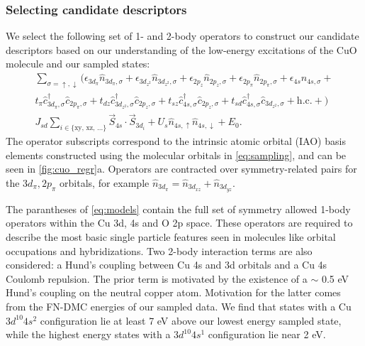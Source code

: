 \documentclass[12pt]{article}
\begin{document}
\subsubsection{Selecting candidate descriptors}
We select the following set of 1- and 2-body operators to construct our candidate descriptors based on our understanding of the low-energy excitations of the CuO molecule and our sampled states:
\begin{equation}
\begin{split}
\sum_{\sigma = \uparrow, \downarrow} \Bigg(\epsilon_{3d_\pi}\hat{n}_{3d_\pi,\sigma} + \epsilon_{3d_{z^2}}\hat{n}_{3d_{z^2},\sigma} +  \epsilon_{2p_z} \hat{n}_{2p_z,\sigma} + \epsilon_{2p_\pi}\hat{n}_{2p_\pi,\sigma} + \epsilon_{4s}\hat{n}_{4s,\sigma} +\\
t_\pi \hat{c}_{3d_\pi,\sigma}^\dagger \hat{c}_{2p_\pi,\sigma} + t_{dz} \hat{c}_{3d_{z^2},\sigma}^\dagger \hat{c}_{2p_z,\sigma}  + t_{sz}\hat{c}_{4s,\sigma}^\dagger \hat{c}_{2p_z,\sigma} + t_{sd}\hat{c}_{4s,\sigma}^\dagger \hat{c}_{3d_{z^2},\sigma} + \text{h.c.} + \Bigg)  \\
J_{sd}\sum_{i\in {\{\text{xy, xz, ...}}\}} \vec{S}_{4s} \cdot \vec{S}_{3d_i} + U_s \hat{n}_{4s,\uparrow}\hat{n}_{4s,\downarrow} + E_0.
\end{split}
\label{eq:models}
\end{equation}
The operator subscripts correspond to the intrinsic atomic orbital (IAO) basis elements constructed using the molecular orbitals in \eqref{eq:sampling}, and can be seen in \ref{fig:cuo_regr}a.
Operators are contracted over symmetry-related pairs for the $3d_\pi, 2p_\pi$ orbitals, for example $\hat{n}_{3d_\pi} = \hat{n}_{3d_{xz}} + \hat{n}_{3d_{yz}}$.

The parantheses of \eqref{eq:models} contain the full set of symmetry allowed 1-body operators within the Cu 3d, 4s and O 2p space.
These operators are required to describe the most basic single particle features seen in molecules like orbital occupations and hybridizations.
Two 2-body interaction terms are also considered: a Hund's coupling between Cu 4s and 3d orbitals and a Cu 4s Coulomb repulsion.
The prior term is motivated by the existence of a $\sim $ 0.5 eV Hund's coupling on the neutral copper atom.
Motivation for the latter comes from the FN-DMC energies of our sampled data.
We find that states with a Cu $3d^{10} 4s^{2}$ configuration lie at least 7 eV above our lowest energy sampled state, while the highest energy states with a $3d^{10} 4s^{1}$ configuration lie near 2 eV.
\end{document}
